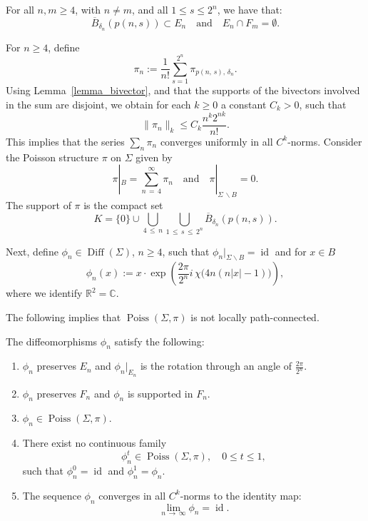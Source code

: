 \documentclass[AHL,Unicode,published]{cedram}
\newcommand{\R}{\mathbb{R}}
\newcommand{\norm}[1]{\|#1\|}
\newcommand{\bbC}{\mathbb{C}}
\DeclareMathOperator{\Poiss}{Poiss}
\DeclareMathOperator{\Diff}{Diff}
\DeclareMathOperator{\id}{id}
\newcommand*{\alphenumi}{\renewcommand*{\theenumi}{\alph{enumi}}}
\begin{document}
\begin{lemm}\label{lemma_annuli}
For all $n,m\geq 4$, with $n\neq m$, and all $1\leq s\leq 2^n$, we have that:
\[
\overline{B}_{\delta_n}\left(p(n,s)\right)\subset E_n\quad \text{and}\quad E_n\cap F_m=\emptyset.
\]
\end{lemm}

For $n\geq 4$, define
\[
\pi_n:=\frac{1}{n!}\sum_{s=1}^{2^n}\pi_{p(n,\,s),\,\delta_{n}}.
\]
Using Lemma~\eqref{lemma_bivector}, and that the supports of the bivectors involved in the sum are disjoint, we obtain for each $k\geq 0$ a constant $C_k>0$, such that
\[
\norm{\pi_n}_k\leq C_k\frac{n^k2^{nk}}{n!}.
\]
This implies that the series $\sum_n \pi_n$ converges uniformly in all $C^k$-norms. Consider the Poisson structure $\pi$ on $\Sigma$ given by
\[
\pi|_B=\sum_{n\,=\,4}^{\infty}\pi_n\quad \text{and}\quad \pi|_{\Sigma\,\backslash B}=0.
\]
The support of $\pi$ is the compact set
\[
K=\{0\}\cup \bigcup_{4\,\leq\,n}\bigcup_{1\,\leq\,s\,\leq\,2^n}\overline{B}_{\delta_{n}}\left(p(n,s)\right).
\]

Next, define $\phi_n\in\Diff(\Sigma)$, $n\geq 4$, such that $\phi_n|_{\Sigma\backslash B}=\id$ and for $x\in B$
\[
\phi_n(x):=x\cdot \exp\left(\frac{2\pi}{2^n}i\, \chi\big(4n(n|x|-1)\big)\right),
\]
where we identify $\R^2=\bbC$.

The following implies that $\Poiss(\Sigma,\pi)$ is not locally path-connected.

\begin{prop}\label{prop}
The diffeomorphisms $\phi_n$ satisfy the following:
\begin{enumerate}\alphenumi
\item \label{prop1.3.1}$\phi_n$ preserves $E_n$ and $\phi_n|_{E_n}$ is the rotation through an angle of $\tfrac{2\pi}{2^{n}}$.
\item \label{prop1.3.2}$\phi_n$ preserves $F_n$ and $\phi_n$ is supported in $F_n$.
\item \label{prop1.3.3}$\phi_n\in\Poiss(\Sigma,\pi)$.
\item \label{prop1.3.4}There exist no continuous family
\[
\phi_n^t\in \Poiss(\Sigma,\pi), \quad 0\leq t\leq 1,
\]
such that $\phi_n^0=\id$ and $\phi_n^1=\phi_n$.
\item\label{prop1.3.5} The sequence $\phi_n$ converges in all $C^k$-norms to the identity map:
\[
\lim_{n\,\to\,\infty}\phi_n=\id.
\]
\end{enumerate}
\end{prop}
\end{document}
